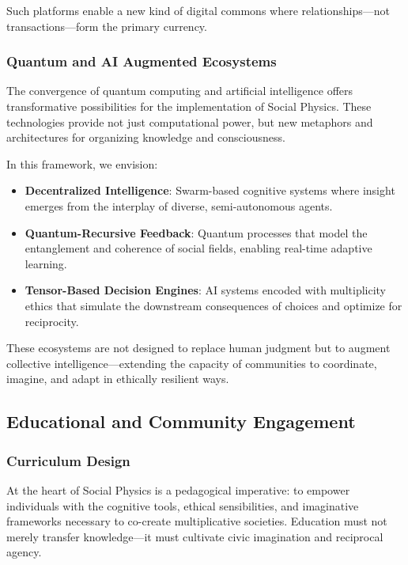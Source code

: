 \documentclass{article}
\theoremstyle{plain}
\theoremstyle{claimstyle}
\begin{document}
Such platforms enable a new kind of digital commons where relationships—not transactions—form the primary currency.

\subsubsection{Quantum and AI Augmented Ecosystems}

The convergence of quantum computing and artificial intelligence offers transformative possibilities for the implementation of Social Physics. These technologies provide not just computational power, but new metaphors and architectures for organizing knowledge and consciousness.

In this framework, we envision:

\begin{itemize}
    \item \textbf{Decentralized Intelligence}: Swarm-based cognitive systems where insight emerges from the interplay of diverse, semi-autonomous agents.
    \item \textbf{Quantum-Recursive Feedback}: Quantum processes that model the entanglement and coherence of social fields, enabling real-time adaptive learning.
    \item \textbf{Tensor-Based Decision Engines}: AI systems encoded with multiplicity ethics that simulate the downstream consequences of choices and optimize for reciprocity.
\end{itemize}

These ecosystems are not designed to replace human judgment but to augment collective intelligence—extending the capacity of communities to coordinate, imagine, and adapt in ethically resilient ways.

\subsection{Educational and Community Engagement}

\subsubsection{Curriculum Design}

At the heart of Social Physics is a pedagogical imperative: to empower individuals with the cognitive tools, ethical sensibilities, and imaginative frameworks necessary to co-create multiplicative societies. Education must not merely transfer knowledge—it must cultivate civic imagination and reciprocal agency.
\end{document}
